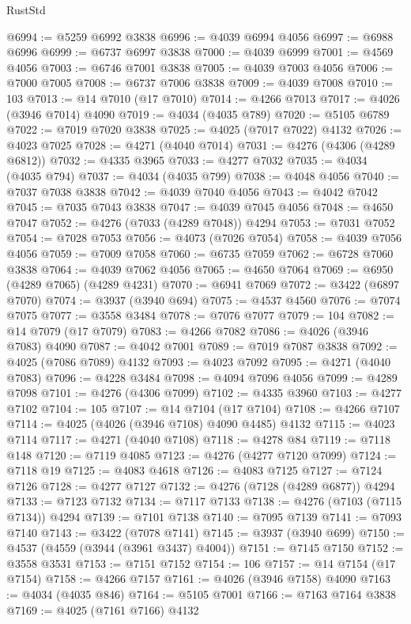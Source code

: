 \begin{lexlean}{RustStd}
\begin{coremodule}
@6994 := @5259 @6992 @3838
@6996 := @4039 @6994 @4056
@6997 := @6988 @6996
@6999 := @6737 @6997 @3838
@7000 := @4039 @6999
@7001 := @4569 @4056
@7003 := @6746 @7001 @3838
@7005 := @4039 @7003 @4056
@7006 := @7000 @7005
@7008 := @6737 @7006 @3838
@7009 := @4039 @7008
@7010 := 103
@7013 := @14 @7010 (@17 @7010)
@7014 := @4266 @7013
@7017 := @4026 (@3946 @7014) @4090
@7019 := @4034 (@4035 @789)
@7020 := @5105 @6789
@7022 := @7019 @7020 @3838
@7025 := @4025 (@7017 @7022) @4132
@7026 := @4023 @7025
@7028 := @4271 (@4040 @7014)
@7031 := @4276 (@4306 (@4289 @6812))
@7032 := @4335 @3965
@7033 := @4277 @7032
@7035 := @4034 (@4035 @794)
@7037 := @4034 (@4035 @799)
@7038 := @4048 @4056
@7040 := @7037 @7038 @3838
@7042 := @4039 @7040 @4056
@7043 := @4042 @7042
@7045 := @7035 @7043 @3838
@7047 := @4039 @7045 @4056
@7048 := @4650 @7047
@7052 := @4276 (@7033 (@4289 @7048)) @4294
@7053 := @7031 @7052
@7054 := @7028 @7053
@7056 := @4073 (@7026 @7054)
@7058 := @4039 @7056 @4056
@7059 := @7009 @7058
@7060 := @6735 @7059
@7062 := @6728 @7060 @3838
@7064 := @4039 @7062 @4056
@7065 := @4650 @7064
@7069 := @6950 (@4289 @7065) (@4289 @4231)
@7070 := @6941 @7069
@7072 := @3422 (@6897 @7070)
@7074 := @3937 (@3940 @694)
@7075 := @4537 @4560
@7076 := @7074 @7075
@7077 := @3558 @3484
@7078 := @7076 @7077
@7079 := 104
@7082 := @14 @7079 (@17 @7079)
@7083 := @4266 @7082
@7086 := @4026 (@3946 @7083) @4090
@7087 := @4042 @7001
@7089 := @7019 @7087 @3838
@7092 := @4025 (@7086 @7089) @4132
@7093 := @4023 @7092
@7095 := @4271 (@4040 @7083)
@7096 := @4228 @3484
@7098 := @4094 @7096 @4056
@7099 := @4289 @7098
@7101 := @4276 (@4306 @7099)
@7102 := @4335 @3960
@7103 := @4277 @7102
@7104 := 105
@7107 := @14 @7104 (@17 @7104)
@7108 := @4266 @7107
@7114 := @4025 (@4026 (@3946 @7108) @4090 @4485) @4132
@7115 := @4023 @7114
@7117 := @4271 (@4040 @7108)
@7118 := @4278 @84
@7119 := @7118 @148
@7120 := @7119 @4085
@7123 := @4276 (@4277 @7120 @7099)
@7124 := @7118 @19
@7125 := @4083 @4618
@7126 := @4083 @7125
@7127 := @7124 @7126
@7128 := @4277 @7127
@7132 := @4276 (@7128 (@4289 @6877)) @4294
@7133 := @7123 @7132
@7134 := @7117 @7133
@7138 := @4276 (@7103 (@7115 @7134)) @4294
@7139 := @7101 @7138
@7140 := @7095 @7139
@7141 := @7093 @7140
@7143 := @3422 (@7078 @7141)
@7145 := @3937 (@3940 @699)
@7150 := @4537 (@4559 (@3944 (@3961 @3437) @4004))
@7151 := @7145 @7150
@7152 := @3558 @3531
@7153 := @7151 @7152
@7154 := 106
@7157 := @14 @7154 (@17 @7154)
@7158 := @4266 @7157
@7161 := @4026 (@3946 @7158) @4090
@7163 := @4034 (@4035 @846)
@7164 := @5105 @7001
@7166 := @7163 @7164 @3838
@7169 := @4025 (@7161 @7166) @4132

\end{coremodule}
\end{lexlean}
